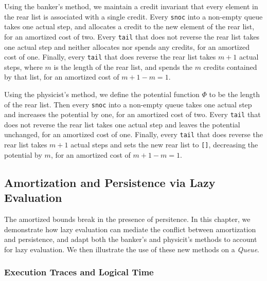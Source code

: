 \documentclass[12pt, a4paper]{article} %
\newcommand{\code}[1]{\texttt{#1}} %
\begin{document}
Using the banker's method, we maintain a credit invariant that every element in the rear list is associated with a single credit. Every \code{snoc} into a non-empty queue takes one actual step, and allocates a credit to the new element of the rear list, for an amortized cost of two. Every \code{tail} that does not reverse the rear list takes one actual step and neither allocates nor spends any credits, for an amortized cost of one. Finally, every \code{tail} that does reverse the rear list takes $m + 1$ actual steps, where $m$ is the length of the rear list, and spends the $m$ credits contained by that list, for an amortized cost of $m + 1 - m = 1$.

Using the physicist's method, we define the potential function $\Phi$ to be the length of the rear list. Then every \code{snoc} into a non-empty queue takes one actual step and increases the potential by one, for an amortized cost of two. Every \code{tail} that does not reverse the rear list takes one actual step and leaves the potential unchanged, for an amortized cost of one. Finally, every \code{tail} that does reverse the rear list takes $m+1$ actual steps and sets the new rear list to \code{[]}, decreasing the potential by $m$, for an amortized cost of $m + 1 - m = 1$.

















\newpage

\subsection{Amortization and Persistence via Lazy Evaluation}%
\label{sub:Amortization and Persistence via Lazy Evaluation}

The amortized bounds break in the presence of persitence. In this chapter, we demonstrate how lazy evaluation can mediate the conflict between amortization and persistence, and adapt both the banker's and physicit's methods to account for lazy evaluation. We then illustrate the use of these new methods on a \textit{Queue}.

\subsubsection{Execution Traces and Logical Time}%
\end{document}
